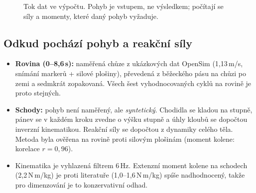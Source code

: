 \documentclass[11pt,a4paper]{article}
\newcommand{\Nm}{\,N\,m}
\begin{document}
\begin{figure}[H]
\centering
{}
\caption{Tok dat ve výpočtu. Pohyb je vstupem, ne výsledkem; počítají se síly a momenty,
které daný pohyb vyžaduje.}
\label{fig:tok}
\end{figure}

\subsection{Odkud pochází pohyb a reakční síly}
\begin{itemize}
  \item \textbf{Rovina (0--8,6\,s):} naměřená chůze z ukázkových dat OpenSim (1,13\,m/s,
        snímání markerů + silové plošiny), převedená z běžeckého pásu na chůzi po zemi
        a sedmkrát zopakovaná. Všech šest vyhodnocovaných cyklů na rovině je proto stejných.
  \item \textbf{Schody:} pohyb není naměřený, ale \emph{syntetický}. Chodidla se kladou
        na stupně, pánev se v každém kroku zvedne o výšku stupně a úhly kloubů se dopočtou
        inverzní kinematikou. Reakční síly se dopočtou z dynamiky celého těla. Metoda byla ověřena
        na rovině proti silovým plošinám (moment kolene: korelace $r=0{,}96$).
  \item Kinematika je vyhlazená filtrem 6\,Hz. Extenzní moment kolene na schodech
        (2,2\Nm/kg) je proti literatuře (1,0--1,6\Nm/kg) spíše nadhodnocený, takže pro dimenzování
        je to konzervativní odhad.
\end{itemize}
\end{document}
